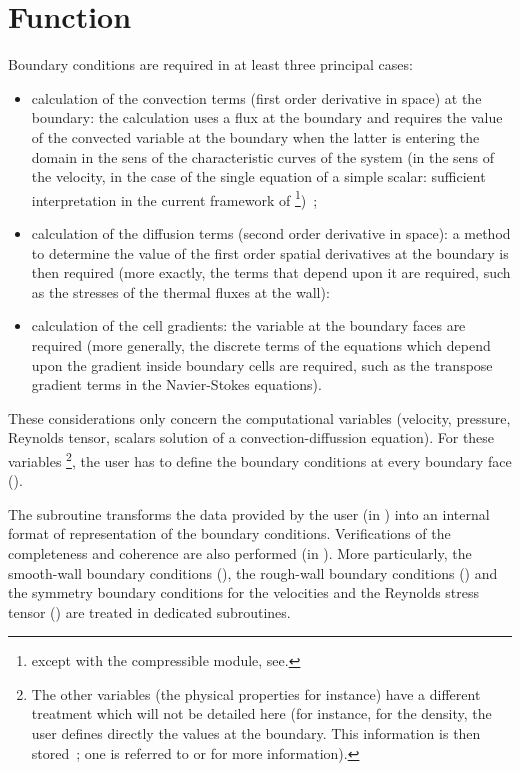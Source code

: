 \section*{Function}
Boundary conditions are required in at least three principal cases:
\begin{itemize}
\item calculation of the convection terms (first order derivative in space) at
the boundary: the calculation uses a flux at the boundary and requires the
value of the convected variable at the boundary when the latter is entering
the domain in the sens of the characteristic curves of the system (in the sens
of the velocity, in the case of the single equation of a simple scalar:
 sufficient interpretation in the current framework of
\CS\footnote{except with the compressible module, see. })~;
\item calculation of the diffusion terms (second order derivative
in space):
a method to determine the value of the first order spatial derivatives
at the boundary is then required
 (more exactly, the terms that depend upon it are required,
 such as the stresses of the thermal fluxes at the wall):
\item calculation of the cell  gradients: the variable at the boundary faces
 are required (more generally, the discrete terms of the equations which depend
upon the gradient inside boundary cells are required, such as the transpose
gradient terms in the Navier-Stokes equations).
\end{itemize}
These considerations only concern the computational variables
(velocity, pressure, Reynolds tensor,
scalars solution of a convection-diffussion equation). For these variables
\footnote{
The other variables
(the physical properties for instance) have a different treatment which will
not be detailed here (for instance, for the density, the user defines
directly the values at the boundary. This information is then stored~; one
is referred to  or  for more information).
},
the user has to define the boundary conditions at every boundary face
().


The  subroutine transforms the data provided by the user
(in ) into an internal format of representation of the boundary
 conditions. Verifications of the completeness and coherence are also
performed (in ). More particularly, the smooth-wall boundary conditions
 (), the rough-wall boundary conditions ()
and the symmetry boundary conditions for the velocities and
the Reynolds stress tensor () are treated in dedicated subroutines.

